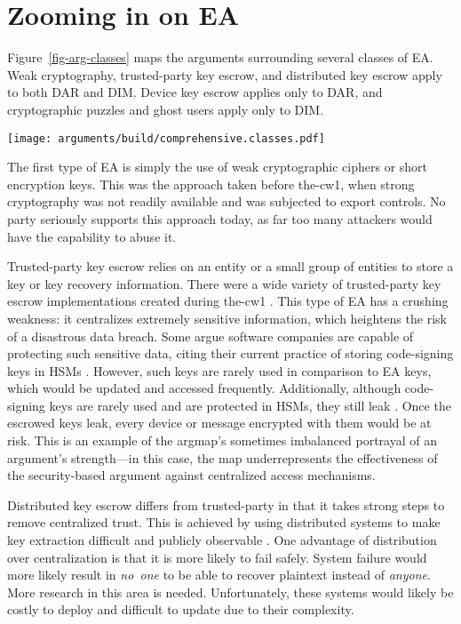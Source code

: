 \documentclass{IEEEtran}
\def\ii#1{\mbox{\textit{#1}}}
\newcommand{\myfig}[1]{Figure~\ref{#1}}
\begin{document}
\section{Zooming in on EA}
\label{sec-ea-types}

\myfig{fig-arg-classes} maps the arguments surrounding several classes of \ac{EA}. Weak cryptography, trusted-party key
escrow, and distributed key escrow apply to both \ac{DAR} and \ac{DIM}. Device key escrow applies only to \ac{DAR}, and
cryptographic puzzles and ghost users apply only to \ac{DIM}.

\begin{sidewaysfigure*}[p!]
  \centering
  \texttt{[image: arguments/build/comprehensive.classes.pdf]}
  \caption{Classes of EA}
  \label{fig-arg-classes}
\end{sidewaysfigure*}

The first type of \ac{EA} is simply the use of weak cryptographic ciphers or short encryption keys. This was the
approach taken before \ac{the-cw1}, when strong cryptography was not readily available and was subjected to export
controls. No party seriously supports this approach today, as far too many attackers would have the capability to abuse
it.

Trusted-party key escrow relies on an entity or a small group of entities to store a key or key recovery information.
There were a wide variety of trusted-party key escrow implementations created during \ac{the-cw1}
\cite{denning_taxonomy_1996}. This type of \ac{EA} has a crushing weakness: it centralizes extremely sensitive
information, which heightens the risk of a disastrous data breach. Some argue software companies are capable of
protecting such sensitive data, citing their current practice of storing code-signing keys in \acp{HSM}
\cite{ozzie_2018}. However, such keys are rarely used in comparison to \ac{EA} keys, which would be updated and accessed
frequently. Additionally, although code-signing keys are rarely used and are protected in \acp{HSM}, they still leak
\cite{green_2018}. Once the escrowed keys leak, every device or message encrypted with them would be at risk. This is an
example of the \ac{argmap}'s sometimes imbalanced portrayal of an argument's strength---in this case, the map
underrepresents the effectiveness of the security-based argument against centralized access mechanisms.

Distributed key escrow differs from trusted-party in that it takes strong steps to remove centralized trust. This is
achieved by using distributed systems to make key extraction difficult and publicly observable \cite{phan_key_2017}
\cite{servan_schreiber_jje_2020}. One advantage of distribution over centralization is that it is more likely to fail
safely. System failure would more likely result in \ii{no one} to be able to recover plaintext instead of \ii{anyone}.
More research in this area is needed. Unfortunately, these systems would likely be costly to deploy and difficult to
update due to their complexity.
\end{document}

